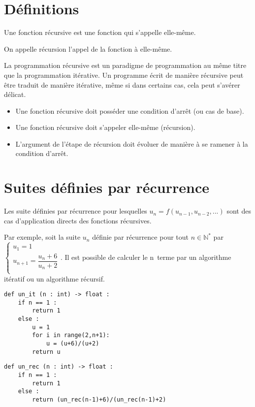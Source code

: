 \section{Définitions}
\begin{defi}%
Une fonction récursive est une fonction qui s'appelle elle-même.

On appelle récursion l'appel de la fonction à elle-même.
\end{defi}

La programmation récursive est un paradigme de programmation au même titre que la programmation itérative. Un programme écrit de manière récursive peut être traduit de manière itérative, même si dans certains cas, cela peut s'avérer délicat.


\begin{methode}
\begin{itemize}
\item Une fonction récursive doit posséder une condition d'arrêt (ou cas de base).
\item Une fonction récursive doit s'appeler elle-même (récursion).
\item L'argument de l'étape de récursion doit évoluer de manière à se ramener à la condition d'arrêt.
\end{itemize}
\end{methode}
 
 



\section{Suites définies par récurrence}

Les suite définies par récurrence pour lesquelles $u_{n}=f\left(u_{n-1},u_{n-2},...\right)$ sont des cas d'application directs des fonctions récursives. 

Par exemple, soit la suite $u_n$ définie par récurrence pour tout $n\in\mathbb{N}^*$ par 
$
\left\{
\begin{array}{ll} 
u_1 = 1 \\
u_{n+1} = \dfrac{u_n + 6}{u_n + 2} \\
\end{array}
\right.
$. Il est possible de calculer le n\ieme \, terme par un algorithme itératif ou un algorithme récursif. 

\noindent\begin{minipage}[c]{.45\linewidth}
\begin{lstlisting}
def un_it (n : int) -> float :
    if n == 1 :
        return 1
    else : 
        u = 1
        for i in range(2,n+1):
            u = (u+6)/(u+2)
        return u
\end{lstlisting}
\end{minipage} \hfill
\begin{minipage}[c]{.45\linewidth}
\begin{lstlisting}
def un_rec (n : int) -> float :
    if n == 1 :
        return 1
    else : 
        return (un_rec(n-1)+6)/(un_rec(n-1)+2)
\end{lstlisting}
\end{minipage} 

